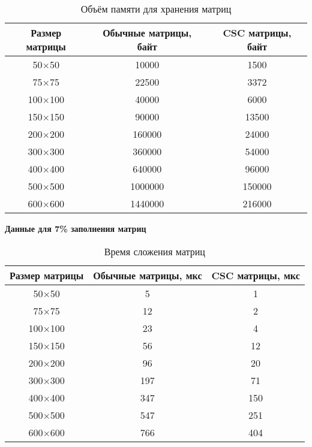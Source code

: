 \begin{table}[H]
	\centering
	\caption{Объём памяти для хранения матриц}
	\begin{tabular}{|c|c|c|}
		\hline
		Размер матрицы & Обычные матрицы, байт & CSC матрицы, байт \\ \hline
		50$\times$50         & 10000                 & 1500             \\ \hline
		75$\times$75         & 22500                 & 3372             \\ \hline
		100$\times$100        & 40000                 & 6000             \\ \hline
		150$\times$150        & 90000                 & 13500            \\ \hline
		200$\times$200        & 160000                & 24000            \\ \hline
		300$\times$300        & 360000                & 54000            \\ \hline
		400$\times$400        & 640000                & 96000            \\ \hline
		500$\times$500        & 1000000               & 150000           \\ \hline
		600$\times$600        & 1440000               & 216000           \\ \hline
	\end{tabular}
\end{table}

\newpage
\textbf{Данные для 7\% заполнения матриц}
\begin{table}[H]
	\centering
	\caption{Время сложения матриц}
	\begin{tabular}{|c|c|c|}
		\hline
		Размер матрицы & Обычные матрицы, мкс & CSC матрицы, мкс \\ \hline
		50$\times$50         & 5                    & 1                \\ \hline
		75$\times$75         & 12                   & 2                \\ \hline
		100$\times$100        & 23                   & 4                \\ \hline
		150$\times$150        & 56                   & 12               \\ \hline
		200$\times$200        & 96                   & 20               \\ \hline
		300$\times$300        & 197                  & 71               \\ \hline
		400$\times$400        & 347                  & 150              \\ \hline
		500$\times$500        & 547                  & 251              \\ \hline
		600$\times$600        & 766                  & 404              \\ \hline
	\end{tabular}
\end{table}

